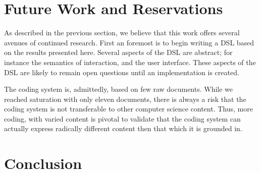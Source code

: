 \documentclass[sigconf]{acmart}
\begin{document}
\section{Future Work and Reservations}

As described in the previous section, we believe that this work offers several
avenues of continued research. First an foremost is to begin writing a DSL based
on the results presented here. Several aspects of the DSL are abstract; for
instance the semantics of interaction, and the user interface. These aspects of
the DSL are likely to remain open questions until an implementation is created. 

The coding system is, admittedly, based on few raw documents. While we reached
saturation with only eleven documents, there is always a risk that the coding
system is not transferable to other computer science content. Thus, more coding,
with varied content is pivotal to validate that the coding system can actually
express radically different content then that which it is grounded in.


\section{Conclusion}



\end{document}
